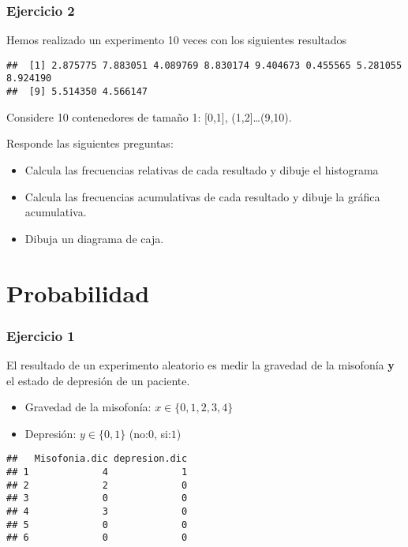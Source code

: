 \documentclass[
]{book}
\providecommand{\tightlist}{%
  \setlength{\itemsep}{0pt}\setlength{\parskip}{0pt}}
\begin{document}
\hypertarget{ejercicio-2}{%
\subsubsection{Ejercicio 2}\label{ejercicio-2}}

Hemos realizado un experimento 10 veces con los siguientes resultados

\begin{verbatim}
##  [1] 2.875775 7.883051 4.089769 8.830174 9.404673 0.455565 5.281055 8.924190
##  [9] 5.514350 4.566147
\end{verbatim}

Considere 10 contenedores de tamaño 1: {[}0,1{]}, (1,2{]}\ldots(9,10).

Responde las siguientes preguntas:

\begin{itemize}
\item
  Calcula las frecuencias relativas de cada resultado y dibuje el histograma
\item
  Calcula las frecuencias acumulativas de cada resultado y dibuje la gráfica acumulativa.
\item
  Dibuja un diagrama de caja.
\end{itemize}

\hypertarget{probabilidad-3}{%
\section{Probabilidad}\label{probabilidad-3}}

\hypertarget{ejercicio-1-1}{%
\subsubsection{Ejercicio 1}\label{ejercicio-1-1}}

El resultado de un experimento aleatorio es medir la gravedad de la misofonía \textbf{y} el estado de depresión de un paciente.

\begin{itemize}
\tightlist
\item
  Gravedad de la misofonía: \(x\in \{0,1,2,3,4\}\)
\item
  Depresión: \(y\in \{0,1\}\) (no:\(0\), si:\(1\))
\end{itemize}

\begin{verbatim}
##   Misofonia.dic depresion.dic
## 1             4             1
## 2             2             0
## 3             0             0
## 4             3             0
## 5             0             0
## 6             0             0
\end{verbatim}
\end{document}
